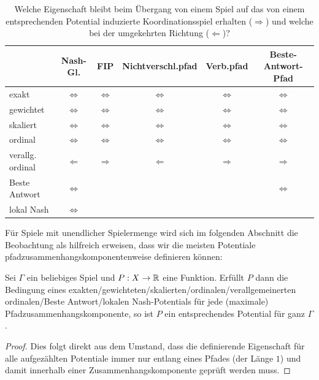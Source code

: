 \begin{table}[h]\centering
	\begin{tabular}{l|ccccc}
						& Nash-Gl. 			& FIP 					& Nichtverschl.pfad 			& Verb.pfad 		& Beste-Antwort-Pfad \\\hline
		exakt			& $\Leftrightarrow$	& $\Leftrightarrow$ 	& $\Leftrightarrow$				& $\Leftrightarrow$	& $\Leftrightarrow$ \\
		gewichtet		& $\Leftrightarrow$	& $\Leftrightarrow$ 	& $\Leftrightarrow$				& $\Leftrightarrow$	& $\Leftrightarrow$ \\		
		skaliert		& $\Leftrightarrow$ & $\Leftrightarrow$ 	& $\Leftrightarrow$				& $\Leftrightarrow$	& $\Leftrightarrow$ \\
		ordinal			& $\Leftrightarrow$	& $\Leftrightarrow$ 	& $\Leftrightarrow$				& $\Leftrightarrow$	& $\Leftrightarrow$ \\
		verallg. ordinal& $\Leftarrow$		& $\Rightarrow$		 	& $\Leftarrow$					& $\Rightarrow$		& $\Rightarrow$ 	\\
		Beste Antwort	& $\Leftrightarrow$	& 					 	& 								& 					& $\Leftrightarrow$ \\
		lokal Nash		& $\Leftrightarrow$	& 					 	& 								& 					& 					
	\end{tabular}	
	\caption{Welche Eigenschaft bleibt beim Übergang von einem Spiel auf das von einem entsprechenden Potential induzierte Koordinationsspiel erhalten ($\Rightarrow$) und welche bei der umgekehrten Richtung ($\Leftarrow$)?\\}\label{tab:PotErhalten}
\end{table}

Für Spiele mit unendlicher Spielermenge wird sich im folgenden Abschnitt die Beobachtung als hilfreich erweisen, dass wir die meisten Potentiale pfadzusammenhangskomponentenweise definieren können:

\begin{beob}\label{beob:KompWeisePotentiale}
	Sei $\Gamma$ ein beliebiges Spiel und $P: X \to \mathbb{R}$ eine Funktion. Erfüllt $P$ dann die Bedingung eines exakten/gewichteten/skalierten/ordinalen/verallgemeinerten ordinalen/Beste Antwort/lokalen Nash-Potentials für jede (maximale) Pfadzusammenhangskomponente, so ist $P$ ein entsprechendes Potential für ganz $\Gamma$.
\end{beob}

\begin{proof}
	Dies folgt direkt aus dem Umstand, dass die definierende Eigenschaft für alle aufgezählten Potentiale immer nur entlang eines Pfades (der Länge $1$) und damit innerhalb einer Zusammenhangskomponente geprüft werden muss.
\end{proof}


